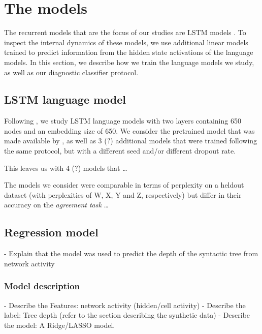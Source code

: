 
\section{The models}

The recurrent models that are the focus of our studies are LSTM models \cite{Hochreiter:Schmidhuber:1997}.
To inspect the internal dynamics of these models, we use additional linear models trained to predict information from the hidden state activations of the language models. 
In this section, we describe how we train the language models we study, as well as our diagnostic classifier protocol.

\subsection{LSTM language model}

Following \cite{Gulordava:etal:2018}, we study LSTM language models with two layers containing 650 nodes and an embedding size of 650.
We consider the pretrained model that was made available by \cite{Gulordava:etal:2018}, as well as 3 (?) additional models that were trained following the same protocol, but with a different seed and/or different dropout rate.

This leaves us with 4 (?) models that \ldots {}

The models we consider were comparable in terms of perplexity on a heldout dataset (with perplexities of W, X, Y and Z, respectively) but differ in their accuracy on the \textit{agreement task} \ldots {}

\subsection{Regression model}
- Explain that the model was used to predict the depth of the syntactic tree from network activity
\subsubsection{Model description}
- Describe the Features: network activity (hidden/cell activity)
- Describe the label: Tree depth (refer to the section describing the synthetic data)
- Describe the model: A Ridge/LASSO model.
